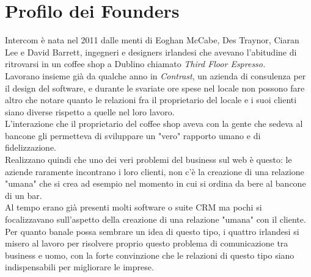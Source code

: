 \documentclass[a4paper, 11pt]{article}
\begin{document}
\section*{Profilo dei Founders}
\par Intercom è nata nel 2011 dalle menti di Eoghan McCabe, Des Traynor, Ciaran Lee e David Barrett, ingegneri e designers irlandesi che avevano l'abitudine di ritrovarsi in un coffee shop a Dublino chiamato \textit{Third Floor Espresso.}\\
Lavorano insieme già da qualche anno in \textit{Contrast}, un azienda di consulenza per il design del software, e durante le svariate ore spese nel locale non possono fare altro che notare quanto le relazioni fra il proprietario del locale e i suoi clienti siano diverse rispetto a quelle nel loro lavoro.\\
L'interazione che il proprietario del coffee shop aveva con la gente che sedeva al bancone gli permetteva di sviluppare un "vero" rapporto umano e di fidelizzazione.\\
Realizzano quindi che uno dei veri problemi del business sul web è questo: le aziende raramente incontrano i loro clienti, non c'è la creazione di una relazione "umana" che si crea ad esempio nel momento in cui si ordina da bere al bancone di un bar.\\
Al tempo erano già presenti molti software o suite CRM ma pochi si focalizzavano sull’aspetto della creazione di una relazione "umana" con il cliente.\\
Per quanto banale possa sembrare un idea di questo tipo, i quattro irlandesi si misero al lavoro per risolvere proprio questo problema di comunicazione tra business e uomo, con la forte convinzione che le relazioni di questo tipo siano indispensabili per migliorare le imprese.
\end{document}

